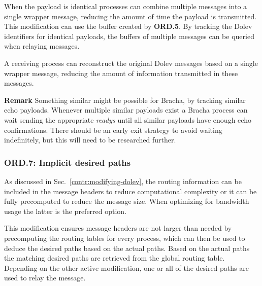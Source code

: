 When the payload is identical processes can combine multiple messages into a single wrapper message, reducing the amount of time the payload is transmitted. This modification can use the buffer created by \textbf{ORD.5}.
By tracking the Dolev identifiers for identical payloads, the buffers of multiple messages can be queried when relaying messages.

A receiving process can reconstruct the original Dolev messages based on a single wrapper message, reducing the amount of information transmitted in these messages.

\textbf{Remark}
Something similar might be possible for Bracha, by tracking similar echo payloads. Whenever multiple similar payloads exist a Bracha process can wait sending the appropriate \textit{readys} until all similar payloads have enough echo confirmations. There should be an early exit strategy to avoid waiting indefinitely, but this will need to be researched further.




\subsubsection{ORD.7: Implicit desired paths}
As discussed in Sec.~\ref{contr:modifying-dolev}, the routing information can be included in the message headers to reduce computational complexity or it can be fully precomputed to reduce the message size. When optimizing for bandwidth usage the latter is the preferred option.

This modification ensures message headers are not larger than needed by precomputing the routing tables for every process, which can then be used to deduce the desired paths based on the actual paths. Based on the actual paths the matching desired paths are retrieved from the global routing table. Depending on the other active modification, one or all of the desired paths are used to relay the message.

